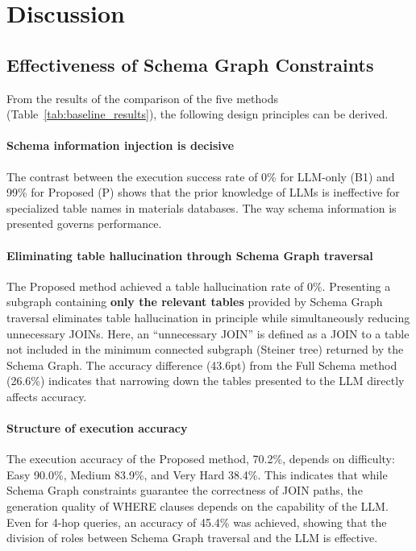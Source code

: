 \documentclass[5p,twocolumn]{elsarticle}
\begin{document}
\section{Discussion}
\label{sec:discussion}

\subsection{Effectiveness of Schema Graph Constraints}

From the results of the comparison of the five methods (Table~\ref{tab:baseline_results}),
the following design principles can be derived.

\paragraph{Schema information injection is decisive}
The contrast between the execution success rate of 0\% for LLM-only (B1) and 99\% for Proposed (P)
shows that the prior knowledge of LLMs is ineffective for specialized table names in materials databases.
The way schema information is presented governs performance.

\paragraph{Eliminating table hallucination through Schema Graph traversal}
The Proposed method achieved a table hallucination rate of 0\%.
Presenting a subgraph containing \textbf{only the relevant tables} provided by Schema Graph traversal
eliminates table hallucination in principle while simultaneously reducing unnecessary JOINs.
Here, an ``unnecessary JOIN'' is defined as a JOIN to a table not included in
the minimum connected subgraph (Steiner tree) returned by the Schema Graph.
The accuracy difference (43.6pt) from the Full Schema method (26.6\%)
indicates that narrowing down the tables presented to the LLM directly affects accuracy.

\paragraph{Structure of execution accuracy}
The execution accuracy of the Proposed method, 70.2\%, depends on difficulty: Easy 90.0\%, Medium 83.9\%, and Very Hard 38.4\%.
This indicates that while Schema Graph constraints guarantee the correctness of JOIN paths,
the generation quality of WHERE clauses depends on the capability of the LLM.
Even for 4-hop queries, an accuracy of 45.4\% was achieved,
showing that the division of roles between Schema Graph traversal and the LLM is effective.
\end{document}
